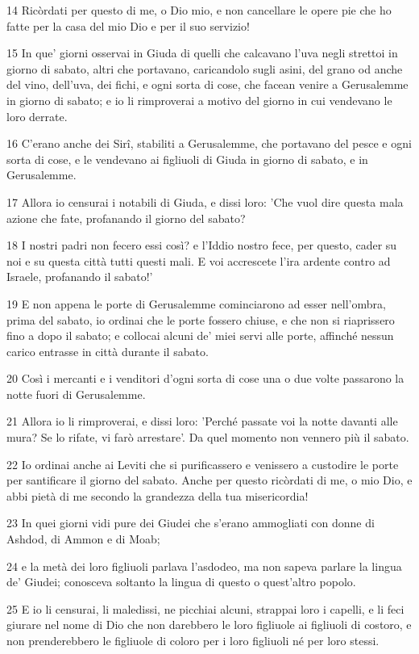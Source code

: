 \par 14 Ricòrdati per questo di me, o Dio mio, e non cancellare le opere pie che ho fatte per la casa del mio Dio e per il suo servizio!
\par 15 In que' giorni osservai in Giuda di quelli che calcavano l'uva negli strettoi in giorno di sabato, altri che portavano, caricandolo sugli asini, del grano od anche del vino, dell'uva, dei fichi, e ogni sorta di cose, che facean venire a Gerusalemme in giorno di sabato; e io li rimproverai a motivo del giorno in cui vendevano le loro derrate.
\par 16 C'erano anche dei Sirî, stabiliti a Gerusalemme, che portavano del pesce e ogni sorta di cose, e le vendevano ai figliuoli di Giuda in giorno di sabato, e in Gerusalemme.
\par 17 Allora io censurai i notabili di Giuda, e dissi loro: 'Che vuol dire questa mala azione che fate, profanando il giorno del sabato?
\par 18 I nostri padri non fecero essi così? e l'Iddio nostro fece, per questo, cader su noi e su questa città tutti questi mali. E voi accrescete l'ira ardente contro ad Israele, profanando il sabato!'
\par 19 E non appena le porte di Gerusalemme cominciarono ad esser nell'ombra, prima del sabato, io ordinai che le porte fossero chiuse, e che non si riaprissero fino a dopo il sabato; e collocai alcuni de' miei servi alle porte, affinché nessun carico entrasse in città durante il sabato.
\par 20 Così i mercanti e i venditori d'ogni sorta di cose una o due volte passarono la notte fuori di Gerusalemme.
\par 21 Allora io li rimproverai, e dissi loro: 'Perché passate voi la notte davanti alle mura? Se lo rifate, vi farò arrestare'. Da quel momento non vennero più il sabato.
\par 22 Io ordinai anche ai Leviti che si purificassero e venissero a custodire le porte per santificare il giorno del sabato. Anche per questo ricòrdati di me, o mio Dio, e abbi pietà di me secondo la grandezza della tua misericordia!
\par 23 In quei giorni vidi pure dei Giudei che s'erano ammogliati con donne di Ashdod, di Ammon e di Moab;
\par 24 e la metà dei loro figliuoli parlava l'asdodeo, ma non sapeva parlare la lingua de' Giudei; conosceva soltanto la lingua di questo o quest'altro popolo.
\par 25 E io li censurai, li maledissi, ne picchiai alcuni, strappai loro i capelli, e li feci giurare nel nome di Dio che non darebbero le loro figliuole ai figliuoli di costoro, e non prenderebbero le figliuole di coloro per i loro figliuoli né per loro stessi.
